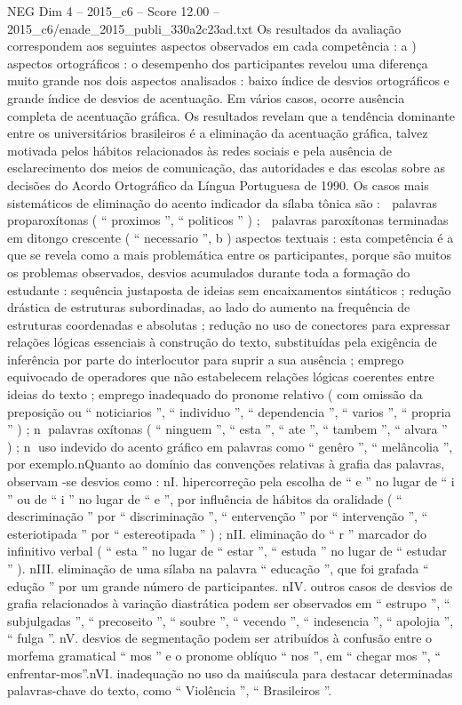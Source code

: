 \begin{textsample}{NEG Dim 4 – 2015\_c6 – Score 12.00 – 2015\_c6/enade\_2015\_publi\_330a2c23ad.txt}
Os resultados da avaliação correspondem aos seguintes aspectos observados em cada competência : a ) aspectos ortográficos : o desempenho dos participantes revelou uma diferença muito grande nos dois aspectos analisados : baixo índice de desvios ortográficos e grande índice de desvios de acentuação.
Em vários casos, ocorre ausência completa de acentuação gráfica.
Os resultados revelam que a tendência dominante entre os universitários brasileiros é a eliminação da acentuação gráfica, talvez motivada pelos hábitos relacionados às redes sociais e pela ausência de esclarecimento dos meios de comunicação, das autoridades e das escolas sobre as decisões do Acordo Ortográfico da Língua Portuguesa de 1990.
Os casos mais sistemáticos de eliminação do acento indicador da sílaba tônica são :  palavras proparoxítonas ( “ proximos ”, “ politicos ” ) ;  palavras paroxítonas terminadas em ditongo crescente ( “ necessario ”, b ) aspectos textuais : esta competência é a que se revela como a mais problemática entre os participantes, porque são muitos os problemas observados, desvios acumulados durante toda a formação do estudante : sequência justaposta de ideias sem encaixamentos sintáticos ; redução drástica de estruturas subordinadas, ao lado do aumento na frequência de estruturas coordenadas e absolutas ; redução no uso de conectores para expressar relações lógicas essenciais à construção do texto, substituídas pela exigência de inferência por parte do interlocutor para suprir a sua ausência ; emprego equivocado de operadores que não estabelecem relações lógicas coerentes entre ideias do texto ; emprego inadequado do pronome relativo ( com omissão da preposição ou “ noticiarios ”, “ individuo ”, “ dependencia ”, “ varios ”, “ propria ” ) ; n palavras oxítonas ( “ ninguem ”, “ esta ”, “ ate ”, “ tambem ”, “ alvara ” ) ; n uso indevido do acento gráfico em palavras como “ genêro ”, “ melâncolia ”, por exemplo.nQuanto ao domínio das convenções relativas à grafia das palavras, observam -se desvios como : nI. hipercorreção pela escolha de “ e ” no lugar de “ i ” ou de “ i ” no lugar de “ e ”, por influência de hábitos da oralidade ( “ descriminação ” por “ discriminação ”, “ entervenção ” por “ intervenção ”, “ esteriotipada ” por “ estereotipada ” ) ; nII. eliminação do “ r ” marcador do infinitivo verbal ( “ esta ” no lugar de “ estar ”, “ estuda ” no lugar de “ estudar ” ). nIII. eliminação de uma sílaba na palavra “ educação ”, que foi grafada “ edução ” por um grande número de participantes. nIV. outros casos de desvios de grafia relacionados à variação diastrática podem ser observados em “ estrupo ”, “ subjulgadas ”, “ precoseito ”, “ soubre ”, “ vecendo ”, “ indesencia ”, “ apolojia ”, “ fulga ”. nV. desvios de segmentação podem ser atribuídos à confusão entre o morfema gramatical “ mos ” e o pronome oblíquo “ nos ”, em “ chegar mos ”, “ enfrentar-mos”.nVI. inadequação no uso da maiúscula para destacar determinadas palavras-chave do texto, como “ Violência ”, “ Brasileiros ”.

\end{textsample}
